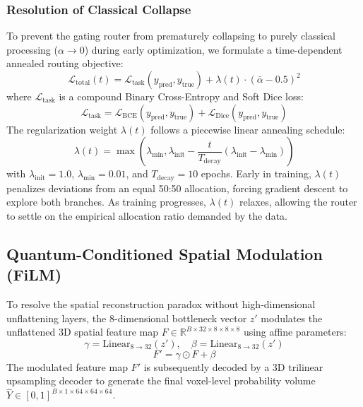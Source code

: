 \subsubsection{Resolution of Classical Collapse}
To prevent the gating router from prematurely collapsing to purely classical processing ($\alpha \to 0$) during early optimization, we formulate a time-dependent annealed routing objective:
\begin{equation}
    \mathcal{L}_{\text{total}}(t) = \mathcal{L}_{\text{task}}(y_{\text{pred}}, y_{\text{true}}) + \lambda(t) \cdot (\bar{\alpha} - 0.5)^2
\end{equation}
where $\mathcal{L}_{\text{task}}$ is a compound Binary Cross-Entropy and Soft Dice loss:
\begin{equation}
    \mathcal{L}_{\text{task}} = \mathcal{L}_{\text{BCE}}(y_{\text{pred}}, y_{\text{true}}) + \mathcal{L}_{\text{Dice}}(y_{\text{pred}}, y_{\text{true}})
\end{equation}
The regularization weight $\lambda(t)$ follows a piecewise linear annealing schedule:
\begin{equation}
    \lambda(t) = \max\left( \lambda_{\min}, \lambda_{\text{init}} - \frac{t}{T_{\text{decay}}} (\lambda_{\text{init}} - \lambda_{\min}) \right)
\end{equation}
with $\lambda_{\text{init}} = 1.0$, $\lambda_{\min} = 0.01$, and $T_{\text{decay}} = 10$ epochs. 
Early in training, $\lambda(t)$ penalizes deviations from an equal 50:50 allocation, forcing gradient descent to explore both branches. 
As training progresses, $\lambda(t)$ relaxes, allowing the router to settle on the empirical allocation ratio demanded by the data.

\subsection{Quantum-Conditioned Spatial Modulation (FiLM)}
To resolve the spatial reconstruction paradox without high-dimensional unflattening layers, the 8-dimensional bottleneck vector $z'$ modulates the unflattened 3D spatial feature map $F \in \mathbb{R}^{B \times 32 \times 8 \times 8 \times 8}$ using affine parameters:
\begin{equation}
    \gamma = \text{Linear}_{8 \to 32}(z'), \quad \beta = \text{Linear}_{8 \to 32}(z')
\end{equation}
\begin{equation}
    F' = \gamma \odot F + \beta
\end{equation}
The modulated feature map $F'$ is subsequently decoded by a 3D trilinear upsampling decoder to generate the final voxel-level probability volume $\hat{Y} \in [0, 1]^{B \times 1 \times 64 \times 64 \times 64}$.

